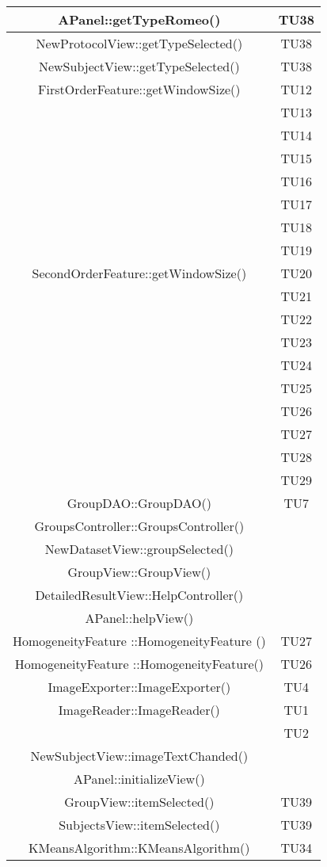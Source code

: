 \begin{center}
\begin{longtable}{|c|c|}
\hline 
APanel::getTypeRomeo() & TU38 \\
\hline 
NewProtocolView::getTypeSelected() & TU38 \\
\hline 
NewSubjectView::getTypeSelected() & TU38 \\
\hline 
FirstOrderFeature::getWindowSize() & TU12 \\
 & TU13 \\
 & TU14 \\
 & TU15 \\
 & TU16 \\
 & TU17 \\
 & TU18 \\
 & TU19 \\
\hline 
SecondOrderFeature::getWindowSize() & TU20 \\
 & TU21 \\
 & TU22 \\
 & TU23 \\
 & TU24 \\
 & TU25 \\
 & TU26 \\
 & TU27 \\
 & TU28 \\
 & TU29 \\
\hline 
GroupDAO::GroupDAO() & TU7 \\
\hline 
GroupsController::GroupsController() &  \\
\hline 
NewDatasetView::groupSelected() &  \\
\hline 
GroupView::GroupView() &  \\
\hline 
DetailedResultView::HelpController() &  \\
\hline 
APanel::helpView() &  \\
\hline 
HomogeneityFeature ::HomogeneityFeature () & TU27 \\
\hline 
HomogeneityFeature ::HomogeneityFeature() & TU26 \\
\hline 
ImageExporter::ImageExporter() & TU4 \\
\hline 
ImageReader::ImageReader() & TU1 \\
 & TU2 \\
\hline 
NewSubjectView::imageTextChanded() &  \\
\hline 
APanel::initializeView() &  \\
\hline 
GroupView::itemSelected() & TU39 \\
\hline 
SubjectsView::itemSelected() & TU39 \\
\hline 
KMeansAlgorithm::KMeansAlgorithm() & TU34 \\

\end{longtable}
\end{center}
